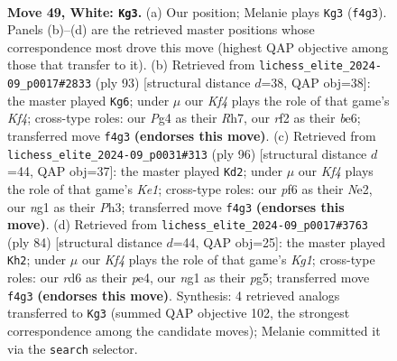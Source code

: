 \documentclass[11pt]{article}
\begin{document}
\clearpage

\begin{figure}[p]\centering
\begin{subfigure}{0.46\textwidth}\centering
\resizebox{\linewidth}{!}{%
\newchessgame
\chessboard[
  setfen={8/7p/3r1p1k/6R1/1p2PKP1/7b/5r2/6n1 w - - 1 49},
  showmover=false,
  pgfstyle=straightmove, color=movearrow, markmove={f4-g3}
]}
\caption{}
\end{subfigure}\hfill
\begin{subfigure}{0.46\textwidth}\centering
\resizebox{\linewidth}{!}{%
\newchessgame
\chessboard[
  setfen={8/7r/4Bp2/P4kp1/3r4/6KP/4RP2/8 b - - 4 47},
  showmover=false,
  pgfstyle=straightmove, color=movearrow, markmove={f5-g6}
]}
\caption{}
\end{subfigure}
\\[4pt]
\begin{subfigure}{0.46\textwidth}\centering
\resizebox{\linewidth}{!}{%
\newchessgame
\chessboard[
  setfen={8/p7/4p2p/1p1nP2k/5PR1/7P/4N3/r3K3 w - - 7 49},
  showmover=false,
  pgfstyle=straightmove, color=movearrow, markmove={e1-d2}
]}
\caption{}
\end{subfigure}\hfill
\begin{subfigure}{0.46\textwidth}\centering
\resizebox{\linewidth}{!}{%
\newchessgame
\chessboard[
  setfen={8/5B2/p6R/4k1pP/4p1b1/4P3/5P2/r5K1 w - - 3 43},
  showmover=false,
  pgfstyle=straightmove, color=movearrow, markmove={g1-h2}
]}
\caption{}
\end{subfigure}
\caption{\textbf{Move 49, White: \texttt{Kg3}.} (a) Our position; Melanie plays \texttt{Kg3} (\texttt{f4g3}). Panels (b)--(d) are the retrieved master positions whose correspondence most drove this move (highest QAP objective among those that transfer to it). (b) Retrieved from \texttt{lichess\_elite\_2024-09\_p0017\#2833} (ply 93) [structural distance $d$=38, QAP obj=38]: the master played \texttt{Kg6}; under $\mu$ our \emph{Kf4} plays the role of that game's \emph{Kf4}; cross-type roles: our \emph{P}g4 as their \emph{R}h7, our \emph{r}f2 as their \emph{b}e6; transferred move \texttt{f4g3} \textbf{(endorses this move)}. (c) Retrieved from \texttt{lichess\_elite\_2024-09\_p0031\#313} (ply 96) [structural distance $d$=44, QAP obj=37]: the master played \texttt{Kd2}; under $\mu$ our \emph{Kf4} plays the role of that game's \emph{Ke1}; cross-type roles: our \emph{p}f6 as their \emph{N}e2, our \emph{n}g1 as their \emph{P}h3; transferred move \texttt{f4g3} \textbf{(endorses this move)}. (d) Retrieved from \texttt{lichess\_elite\_2024-09\_p0017\#3763} (ply 84) [structural distance $d$=44, QAP obj=25]: the master played \texttt{Kh2}; under $\mu$ our \emph{Kf4} plays the role of that game's \emph{Kg1}; cross-type roles: our \emph{r}d6 as their \emph{p}e4, our \emph{n}g1 as their \emph{p}g5; transferred move \texttt{f4g3} \textbf{(endorses this move)}. Synthesis: 4 retrieved analogs transferred to \texttt{Kg3} (summed QAP objective 102, the strongest correspondence among the candidate moves); Melanie committed it via the \texttt{search} selector.}
\label{fig:thought-m96}
\end{figure}
\end{document}
